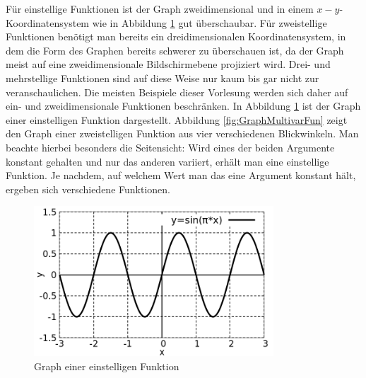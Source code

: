 Für einstellige Funktionen ist der Graph zweidimensional und in einem $x-y$-Koordinatensystem wie in Abbildung \ref{fig:GraphUnivarFun} gut überschaubar. Für zweistellige Funktionen benötigt man bereits ein dreidimensionalen Koordinatensystem, in dem die Form des Graphen bereits schwerer zu überschauen ist, da der Graph meist auf eine zweidimensionale Bildschirmebene projiziert wird. Drei- und mehrstellige Funktionen sind auf diese Weise nur kaum bis gar nicht zur veranschaulichen. Die meisten Beispiele dieser Vorlesung werden sich daher auf ein- und zweidimensionale Funktionen beschränken. In Abbildung \ref{fig:GraphUnivarFun} ist der Graph einer einstelligen Funktion dargestellt. Abbildung \ref{fig:GraphMultivarFun} zeigt den Graph einer zweistelligen Funktion aus vier verschiedenen Blickwinkeln. Man beachte hierbei besonders die Seitensicht: Wird eines der beiden Argumente konstant gehalten und nur das anderen variiert, erhält man eine einstellige Funktion. Je nachdem, auf welchem Wert man das eine Argument konstant hält, ergeben sich verschiedene Funktionen.

\begin{figure}
    \centering
    \includegraphics[width=0.8\textwidth]{./gnuplot/example-univariate-function.png}
    \caption{Graph einer einstelligen Funktion}
    \label{fig:GraphUnivarFun}
\end{figure}

